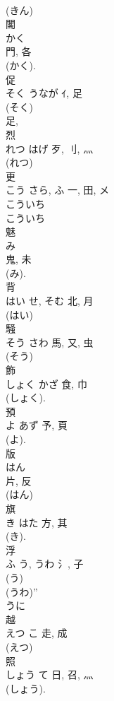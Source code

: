 \documentclass[8pt]{extreport}
\begin{document}
\begin{CJK}{UTF8}{min}
\\	(きん) 
\\	閣	
\\	かく	
\\	門, 各	
\\	(かく). 
\\	促	
\\	そく	うなが	ｲ, 足	
\\	(そく) 
\\	足, 
\\	烈	
\\	れつ	はげ	歹, 刂, 灬	
\\	(れつ) 
\\	更	
\\	こう	さら, ふ	一, 田, メ	
\\	こういち 
\\	こういち 
\\	魅	
\\	み	
\\	鬼, 未	
\\	(み). 
\\	背	
\\	はい	せ, そむ	北, 月	
\\	(はい) 
\\	騒	
\\	そう	さわ	馬, 又, 虫	
\\	(そう) 
\\	飾	
\\	しょく	かざ	食, 巾		
\\	(しょく). 
\\	預	
\\	よ	あず	予, 頁	
\\	(よ). 
\\	版	
\\	はん	
\\	片, 反	
\\	(はん) 
\\	旗	
\\	き	はた	方, 其		
\\	(き). 
\\	浮	
\\	ふ	う, うわ	氵, 子		
\\	(う) 
\\	(うわ)” 
\\	うに 
\\	越	
\\	えつ	こ	走, 成	
\\	(えつ) 
\\	照	
\\	しょう	て	日, 召, 灬	
\\	(しょう). 

\end{CJK}
\end{document}
